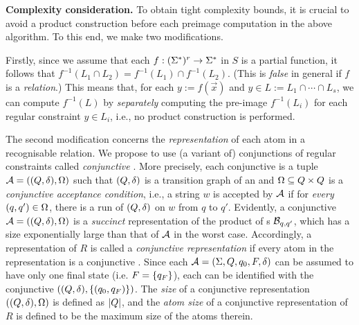 %
\smallskip
\noindent
\textbf{Complexity consideration. }
To obtain tight complexity bounds, it is crucial to 
avoid a product construction before each preimage computation
in the above algorithm.
To this end, we make two modifications.

Firstly,
since we assume that each $f: (\Sigma^*)^r \to \Sigma^*$
in $S$ is a partial function, it follows that $f^{-1}(L_1 \cap L_2) = 
f^{-1}(L_1) \cap f^{-1}(L_2)$. (This is \emph{false} in general if $f$ is a \emph{relation}.)
This means that, for each $y := f(\vec{x})$ and $y\in L := L_1 \cap \cdots \cap L_s$, we can compute $f^{-1}(L)$ by \emph{separately} computing 
the pre-image $f^{-1}(L_i)$ for each regular constraint $y \in L_i$, i.e., no product construction is performed.

The second modification concerns the \emph{representation} of each atom
in %
a recognisable relation. We propose
to use (a variant of) conjunctions of regular constraints called
\emph{conjunctive \FA{}}. 
More precisely, each conjunctive \FA{} is a tuple $\mathcal{A} = ((Q, \delta), \Omega)$
such that $(Q, \delta)$ is a transition graph of an \FA{} and 
$\Omega \subseteq Q \times Q$ is a \emph{conjunctive acceptance 
condition}, i.e., a string $w$ is accepted by $\mathcal{A}$ if 
for \emph{every} $(q, q') \in \Omega$, there is a run of $(Q, \delta)$ on
$w$ from $q$ to $q'$. 
%
Evidently, a  conjunctive \FA{} $\mathcal{A}=((Q, \delta), \Omega)$ is a \emph{succinct} representation of the product of \FA{}s $\mathcal{B}_{q,q'}$, which has a size exponentially large than that of $\mathcal{A}$ in the worst case.
%
%
Accordingly, a representation of $R$ is called a \emph{conjunctive
representation} if every atom in the representation is a conjunctive \FA{}.
Since each \FA{} $\mathcal{A} = 
(\Sigma, Q, q_0, F, \delta)$
can be assumed to have only one final state (i.e. $F = \{q_F\}$), each 
\FA{} can be identified with the conjunctive \FA{}
$((Q,\delta),\{(q_0,q_F)\})$.
The \emph{size} of a conjunctive representation $((Q, \delta), \Omega)$ is defined as $|Q|$, and  the  \emph{atom size} of a conjunctive representation of $R$ is defined to be the maximum size of the atoms therein.

